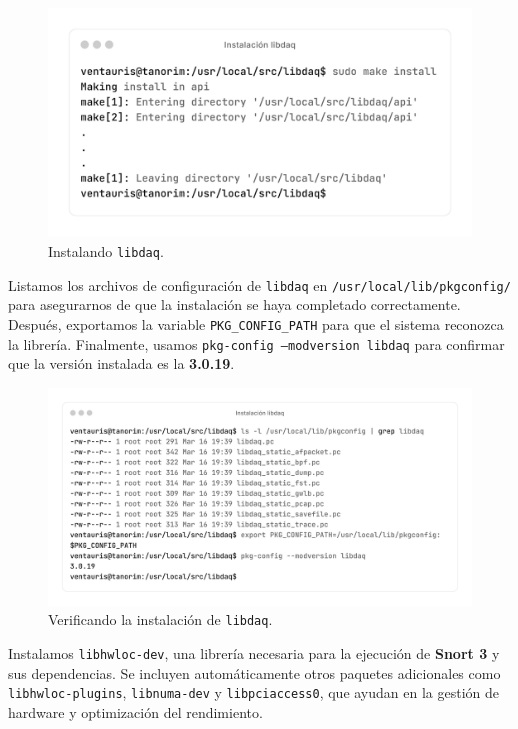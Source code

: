 \documentclass[11pt,a4paper,twoside]{report}
\begin{document}
\begin{figure}[H]
	\centering
	\includegraphics[scale=0.12]{instalacion_snort/13-13.png}
	\caption{Instalando \texttt{libdaq}.}
\end{figure}

Listamos los archivos de configuración de \texttt{libdaq} en \texttt{/usr/local/lib/pkgconfig/} para asegurarnos de que la instalación se haya completado correctamente. Después, exportamos la variable \texttt{PKG\_CONFIG\_PATH} para que el sistema reconozca la librería. Finalmente, usamos \texttt{pkg-config --modversion libdaq} para confirmar que la versión instalada es la \textbf{3.0.19}.

\begin{figure}[H]
	\centering
	\includegraphics[scale=0.12]{instalacion_snort/14-14.png}
	\caption{Verificando la instalación de \texttt{libdaq}.}
\end{figure}

\newpage

Instalamos \texttt{libhwloc-dev}, una librería necesaria para la ejecución de \textbf{Snort 3} y sus dependencias. Se incluyen automáticamente otros paquetes adicionales como \texttt{libhwloc-plugins}, \texttt{libnuma-dev} y \texttt{libpciaccess0}, que ayudan en la gestión de hardware y optimización del rendimiento.
\end{document}
